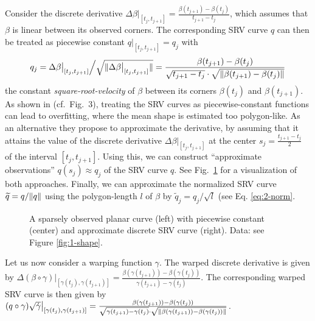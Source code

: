 Consider the discrete derivative $\Delta \beta \big\rvert_{[t_j, t_{j+1}]} = \frac{\beta(t_{j+1}) - \beta(t_{j})}{t_{j+1} - t_j}$, which assumes that $\beta$ is linear between its observed corners. 
The corresponding SRV curve $q$ can then be treated as piecewise constant $q\big\rvert_{[t_{j},t_{j+1}]} = q_j$ with 
\begin{equation}
  q_j = \Delta \beta \big\rvert_{[t_j, t_{j+1}]} \Big/ \sqrt{\lVert\Delta \beta \big\rvert_{[t_j, t_{j+1}]}\rVert} = \frac{\beta(t_{j+1}) - \beta(t_j)}{\sqrt{t_{j+1} - t_j} \cdot \sqrt{\lVert\beta(t_{j+1}) - \beta(t_j)\rVert}}
\end{equation}
the constant \emph{square-root-velocity} of $\beta$ between its corners $\beta(t_j)$ and $\beta(t_{j+1})$.
As shown in \cite{Steyer2021} (cf.\ Fig.\ 3), treating the SRV curves as piecewise-constant functions can lead to overfitting, where the mean shape is estimated too polygon-like.
As an alternative they propose to approximate the derivative, by assuming that it attains the value of the discrete derivative $\Delta \beta \big\rvert_{[t_j,t_{j+1}]}$ at the center $s_j = \frac{t_{j+1} - t_j}{2}$ of the interval $[t_j, t_{j+1}]$.
Using this, we can construct \enquote{approximate observations} $q(s_j) \approx q_j$ of the SRV curve $q$.
See Fig.\ \ref{fig:3-disc} for a visualization of both approaches.
Finally, we can approximate the normalized SRV curve $\widetilde q = q / \lVert q\rVert$ using the polygon-length $l$ of $\beta$ by $\widetilde q_j = q_j \big/ \sqrt{l}$ (see Eq. \ref{eq:2-norm}.

\begin{figure}
  \centering
  \begin{subfigure}{.32\textwidth}
    \centering
  \end{subfigure}\hfill%
  \begin{subfigure}{.32\textwidth}
    \centering
  \end{subfigure}\hfill%
  \begin{subfigure}{.32\textwidth}
    \centering
  \end{subfigure}
  \caption{A sparsely observed planar curve (left) with piecewise constant (center) and approximate discrete SRV curve (right). Data: see Figure \ref{fig:1-shape}.}
  \label{fig:3-disc}
\end{figure}

Let us now consider a warping function $\gamma$.
The warped discrete derivative is given by $\Delta (\beta \circ \gamma) \big\rvert_{[\gamma(t_j), \gamma(t_{j+1})]} = \frac{\beta(\gamma(t_{j+1})) - \beta(\gamma(t_{j}))}{\gamma(t_{j+1}) - \gamma(t_j)}$.
The corresponding warped SRV curve is then given by  $(q \circ \gamma) \sqrt{\dot\gamma} \big\rvert_{[\gamma(t_j), \gamma(t_{j+1})]} = \frac{\beta(\gamma(t_{j+1})) - \beta(\gamma(t_j))}{\sqrt{\gamma(t_{j+1}) - \gamma(t_j)} \cdot \sqrt{\lVert\beta(\gamma(t_{j+1})) - \beta(\gamma(t_j))\rVert}}$.



